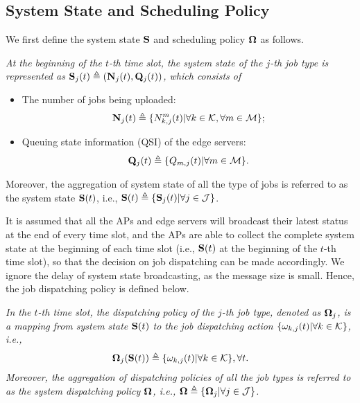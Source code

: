 \subsection{System State and Scheduling Policy}
We first define the system state $\mathbf{S}$ and scheduling policy $\boldsymbol{\Omega}$ as follows. 
\begin{definition} \em
    At the beginning of the $t$-th time slot, the system state of the $j$-th job type is represented as $\mathbf{S}_j(t) \triangleq (\mathbf{N}_j(t),\mathbf{Q}_j(t))$, which consists of
    \begin{itemize}
        \item The number of jobs being uploaded:
        \begin{align}
        \mathbf{N}_j(t) \triangleq \{N_{k,j}^m(t)|\forall k \in \mathcal{K}, \forall m \in \mathcal{M} \};
        \end{align}
        \item Queuing state information (QSI) of the edge servers:
        \begin{align}
        \mathbf{Q}_j(t) \triangleq \{Q_{m,j}(t)|\forall m \in \mathcal{M}\}.
        \end{align}
    \end{itemize}
    Moreover, the aggregation of system state of all the type of jobs is referred to as the system state $\mathbf{S}(t)$, i.e., $\mathbf{S}(t) \triangleq \{\mathbf{S}_j(t) | \forall j\in\mathcal{J} \}$.
\end{definition}

It is assumed that all the APs and edge servers will broadcast their latest status at the end of every time slot, and the APs are able to collect the complete system state at the beginning of each time slot (i.e., $\mathbf{S}(t)$ at the beginning of the $t$-th time slot), so that the decision on job dispatching can be made accordingly. We ignore the delay of system state broadcasting, as the message size is small. Hence, the job dispatching policy is defined below.
\begin{definition} \em
     In the $t$-th time slot, the dispatching policy of the $j$-th job type, denoted as $\boldsymbol{\Omega}_j$, is a mapping from system state $\mathbf{S}(t)$ to the job dispatching action  $\{ \omega_{k,j}(t)|\forall k\in\mathcal{K} \}$, i.e.,
        \begin{align}
        \boldsymbol{\Omega}_{j}(\mathbf{S}(t)) \triangleq \{\omega_{k,j}(t)|\forall k\in\mathcal{K}\}, \forall t.
        \end{align}
    Moreover, the aggregation of dispatching policies of all the job types is referred to as the system dispatching policy $\boldsymbol{\Omega}$, i.e., $\boldsymbol{\Omega} \triangleq \{\boldsymbol{\Omega}_j | \forall j\in\mathcal{J} \}$.
\end{definition}

